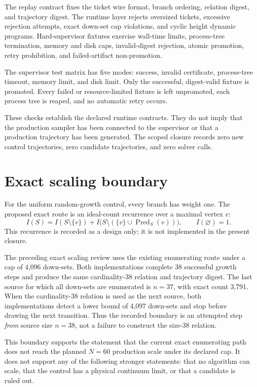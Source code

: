 \documentclass[11pt]{article}
\begin{document}
The replay contract fixes the ticket wire format, branch ordering, relation
digest, and trajectory digest.  The runtime layer rejects oversized tickets,
excessive rejection attempts, exact down-set cap violations, and cyclic height
dynamic programs.  Hard-supervisor fixtures exercise wall-time limits,
process-tree termination, memory and disk caps, invalid-digest rejection,
atomic promotion, retry prohibition, and failed-artifact non-promotion.

The supervisor test matrix has five modes: success, invalid certificate,
process-tree timeout, memory limit, and disk limit.  Only the successful,
digest-valid fixture is promoted.  Every failed or resource-limited fixture is
left unpromoted, each process tree is reaped, and no automatic retry occurs.

These checks establish the declared runtime contracts.  They do not imply that
the production sampler has been connected to the supervisor or that a
production trajectory has been generated.  The scoped closure records zero new
control trajectories, zero candidate trajectories, and zero solver calls.

\section{Exact scaling boundary}

For the uniform random-growth control, every branch has weight one.  The
proposed exact route is an ideal-count recurrence over a maximal vertex $v$:
\[
 I(S)=I(S\setminus\{v\})+
 I\bigl(S\setminus(\{v\}\cup\operatorname{Pred}_S(v))\bigr),
 \qquad I(\varnothing)=1.
\]
This recurrence is recorded as a design only; it is not implemented in the
present closure.

The preceding exact scaling review uses the existing enumerating route under a
cap of 4,096 down-sets.  Both implementations complete 38 successful growth
steps and produce the same cardinality-38 relation and trajectory digest.  The
last source for which all down-sets are enumerated is $n=37$, with exact count
3,791.  When the cardinality-38 relation is used as the next source, both
implementations detect a lower bound of 4,097 down-sets and stop before drawing
the next transition.  Thus the recorded boundary is an attempted step
\emph{from} source size $n=38$, not a failure to construct the size-38 relation.

This boundary supports the statement that the current exact enumerating path
does not reach the planned $N=60$ production scale under its declared cap.  It
does not support any of the following stronger statements: that no algorithm
can scale, that the control has a physical continuum limit, or that a candidate
is ruled out.
\end{document}
